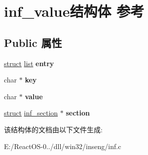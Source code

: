 \hypertarget{structinf__value}{}\section{inf\+\_\+value结构体 参考}
\label{structinf__value}
\subsection*{Public 属性}
\begin{DoxyCompactItemize}
\item 
\mbox{\label{structinf__value_a49e604dc782959e32067360d3af13b5b}} 
\hyperlink{interfacestruct}{struct} \hyperlink{classlist}{list} {\bfseries entry}
\item 
\mbox{\label{structinf__value_acc66884cc9ab4e9a378a79f6eb186406}} 
char $\ast$ {\bfseries key}
\item 
\mbox{\label{structinf__value_a5135c67b75029798dfa89be8de006ebd}} 
char $\ast$ {\bfseries value}
\item 
\mbox{\label{structinf__value_ad972d0ca421121b0d777f2dbd9c435a8}} 
\hyperlink{interfacestruct}{struct} \hyperlink{structinf__section}{inf\+\_\+section} $\ast$ {\bfseries section}
\end{DoxyCompactItemize}


该结构体的文档由以下文件生成\+:\begin{DoxyCompactItemize}
\item 
E\+:/\+React\+O\+S-\/0../dll/win32/inseng/inf.\+c\end{DoxyCompactItemize}
